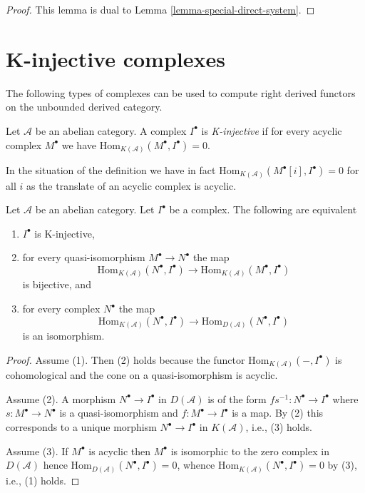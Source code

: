 \begin{proof}
This lemma is dual to
Lemma \ref{lemma-special-direct-system}.
\end{proof}




\section{K-injective complexes}
\label{section-K-injective}

\noindent
The following types of complexes can be used to compute right derived
functors on the unbounded derived category.

\begin{definition}
\label{definition-K-injective}
Let $\mathcal{A}$ be an abelian category. A complex $I^\bullet$
is {\it K-injective} if for every acyclic complex $M^\bullet$ we
have $\text{Hom}_{K(\mathcal{A})}(M^\bullet, I^\bullet) = 0$.
\end{definition}

\noindent
In the situation of the definition we have in fact
$\text{Hom}_{K(\mathcal{A})}(M^\bullet[i], I^\bullet) = 0$ for all $i$
as the translate of an acyclic complex is acyclic.

\begin{lemma}
\label{lemma-K-injective}
Let $\mathcal{A}$ be an abelian category.
Let $I^\bullet$ be a complex. The following are equivalent
\begin{enumerate}
\item $I^\bullet$ is K-injective,
\item for every quasi-isomorphism $M^\bullet \to N^\bullet$ the map
$$
\text{Hom}_{K(\mathcal{A})}(N^\bullet, I^\bullet)
\to \text{Hom}_{K(\mathcal{A})}(M^\bullet, I^\bullet)
$$
is bijective, and
\item for every complex $N^\bullet$ the map
$$
\text{Hom}_{K(\mathcal{A})}(N^\bullet, I^\bullet)
\to \text{Hom}_{D(\mathcal{A})}(N^\bullet, I^\bullet)
$$
is an isomorphism.
\end{enumerate}
\end{lemma}

\begin{proof}
Assume (1). Then (2) holds because the functor
$\text{Hom}_{K(\mathcal{A})}( - , I^\bullet)$ is cohomological
and the cone on a quasi-isomorphism is acyclic.

\medskip\noindent
Assume (2). A morphism $N^\bullet \to I^\bullet$ in $D(\mathcal{A})$
is of the form $fs^{-1} : N^\bullet \to I^\bullet$ where
$s : M^\bullet \to N^\bullet$ is a quasi-isomorphism and
$f : M^\bullet \to I^\bullet$ is a map. By (2) this corresponds to
a unique morphism $N^\bullet \to I^\bullet$ in $K(\mathcal{A})$, i.e.,
(3) holds.

\medskip\noindent
Assume (3). If $M^\bullet$ is acyclic then $M^\bullet$ is isomorphic
to the zero complex in $D(\mathcal{A})$ hence
$\text{Hom}_{D(\mathcal{A})}(N^\bullet, I^\bullet) = 0$, whence
$\text{Hom}_{K(\mathcal{A})}(N^\bullet, I^\bullet) = 0$ by (3),
i.e., (1) holds.
\end{proof}

